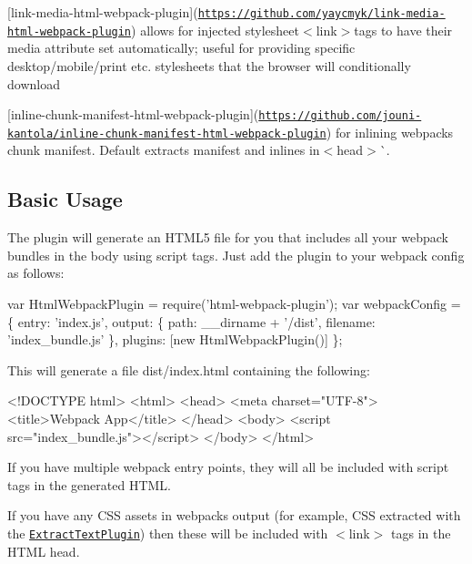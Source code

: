 \begin{DoxyItemize}
\item {\ttfamily \mbox{[}link-\/media-\/html-\/webpack-\/plugin\mbox{]}(\href{https://github.com/yaycmyk/link-media-html-webpack-plugin}{\tt https\+://github.\+com/yaycmyk/link-\/media-\/html-\/webpack-\/plugin}) allows for injected stylesheet}$<$link$>${\ttfamily tags to have their media attribute set automatically; useful for providing specific desktop/mobile/print etc. stylesheets that the browser will conditionally download}
\item {\ttfamily \mbox{[}inline-\/chunk-\/manifest-\/html-\/webpack-\/plugin\mbox{]}(\href{https://github.com/jouni-kantola/inline-chunk-manifest-html-webpack-plugin}{\tt https\+://github.\+com/jouni-\/kantola/inline-\/chunk-\/manifest-\/html-\/webpack-\/plugin}) for inlining webpack\textquotesingle{}s chunk manifest. Default extracts manifest and inlines in}$<$head$>$\`{}.
\end{DoxyItemize}

\subsection*{Basic Usage }

The plugin will generate an H\+T\+M\+L5 file for you that includes all your webpack bundles in the body using {\ttfamily script} tags. Just add the plugin to your webpack config as follows\+:


\begin{DoxyCode}
var HtmlWebpackPlugin = require('html-webpack-plugin');
var webpackConfig = \{
  entry: 'index.js',
  output: \{
    path: \_\_dirname + '/dist',
    filename: 'index\_bundle.js'
  \},
  plugins: [new HtmlWebpackPlugin()]
\};
\end{DoxyCode}


This will generate a file {\ttfamily dist/index.\+html} containing the following\+: 
\begin{DoxyCode}
<!DOCTYPE html>
<html>
  <head>
    <meta charset="UTF-8">
    <title>Webpack App</title>
  </head>
  <body>
    <script src="index\_bundle.js"></script>
  </body>
</html>
\end{DoxyCode}


If you have multiple webpack entry points, they will all be included with {\ttfamily script} tags in the generated H\+T\+ML.

If you have any C\+SS assets in webpack\textquotesingle{}s output (for example, C\+SS extracted with the \href{https://github.com/webpack/extract-text-webpack-plugin}{\tt Extract\+Text\+Plugin}) then these will be included with {\ttfamily $<$link$>$} tags in the H\+T\+ML head.

